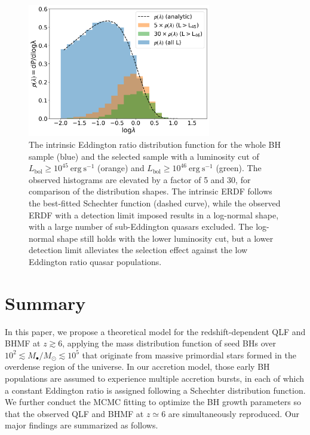 \documentclass[twocolumn, twocolappendix]{aastex63}
\newcommand{\Msun}{M_\odot}
\newcommand{\Lbol}{L_\mathrm{bol}}
\begin{document}
\begin{CJK*}{UTF8}{gbsn}
\begin{figure}
\centering
\includegraphics[width=80mm]{l_hist.png}
\caption{
The intrinsic Eddington ratio distribution function for the whole BH sample (blue) and the selected sample with
a luminosity cut of $\Lbol \geq 10^{45}~\mathrm{erg~s^{-1}}$ (orange) and $\Lbol \geq 10^{46}~\mathrm{erg~s^{-1}}$ (green).  
The observed histograms are elevated by a factor of 5 and 30, for comparison of the distribution shapes.
The intrinsic ERDF follows the best-fitted Schechter function (dashed curve), 
while the observed ERDF with a detection limit imposed results in a log-normal shape, 
with a large number of sub-Eddington quasars excluded.
The log-normal shape still holds with the lower luminosity cut, 
but a lower detection limit alleviates the selection effect against the low Eddington ratio quasar populations.
}
\label{fig:lhist}
\end{figure}
  


\section{Summary}
\label{sec:sum}
In this paper, we propose a theoretical model for the redshift-dependent QLF and BHMF at $z\gtrsim 6$,
applying the mass distribution function of seed BHs over $10^2 \lesssim M_\bullet/\Msun \lesssim 10^{5}$
that originate from massive primordial stars formed in the overdense region of the universe.
In our accretion model, those early BH populations are assumed to experience multiple accretion bursts, in each of which a constant Eddington ratio
is assigned following a Schechter distribution function.
We further conduct the MCMC fitting to optimize the BH growth parameters
so that the observed QLF and BHMF at $z\simeq 6$ are simultaneously reproduced. 
Our major findings are summarized as follows.



\end{CJK*}
\end{document}

